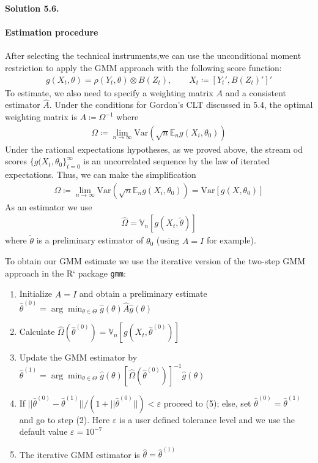 \documentclass[11pt]{article}
\newenvironment{solution}[1]
    {\bigskip\noindent\textbf{Solution #1.} \par}
    {\medskip}
\newcommand{\ev}{\mathbb{E}}
\begin{document}
\begin{solution}{5.6}
\paragraph{Estimation procedure}
After selecting the technical instruments,we can use the unconditional moment restriction  to apply the GMM approach with the following score function:
\begin{align*}
    g(X_t,\theta) = \rho(Y_t,\theta) \otimes B(Z_t), \qquad X_t \coloneq [Y_t', B(Z_t)']'
\end{align*}
To estimate, we also need to specify a weighting matrix $A$ and a consistent estimator $\hat{A}.$ Under the conditions for Gordon's CLT discussed in 5.4, the optimal weighting matrix is $A \coloneq \Omega^{-1}$ where
\begin{align*}
    \Omega \coloneq \lim_{n\to\infty} \text{Var}(\sqrt{n}\ev_ng(X_i,\theta_0))
\end{align*}
Under the rational expectations hypotheses, as we proved above, the stream od scores $\{g(X_t,\theta_0 \}_{t=0}^\infty$ is an uncorrelated sequence by the law of iterated expectations. Thus, we can make the simplification
\begin{align*}
    \Omega \coloneq \lim_{n\to\infty} \text{Var}(\sqrt{n}\ev_ng(X_i,\theta_0)) = \text{Var}\left[g(X,\theta_0)\right]
\end{align*}
As an estimator we use
\begin{align*}
    \hat{\Omega} =  \mathbb{V}_n[g(X_t,\tilde{\theta})]
\end{align*}
where $\tilde\theta$ is a preliminary estimator of $\theta_0$ (using $A = I$ for example).

\medskip

To obtain our GMM estimate we use the iterative version of the two-step GMM approach in the R` package \verb|gmm|:
\begin{enumerate}
    \item Initialize $\hat{A} = I$ and obtain a preliminary estimate $\hat{\theta}^{(0)} = \arg\min_{\theta\in\Theta} \hat{g}(\theta)\hat{A}\hat{g}(\theta)$
    \item Calculate $\hat{\Omega}(\hat{\theta}^{(0)}) = \mathbb{V}_n[g(X_t,\hat{\theta}^{(0)})]$
    \item Update the GMM estimator by $\hat{\theta}^{(1)} = \arg\min_{\theta\in\Theta} \hat{g}(\theta)\left[ \hat{\Omega}(\hat{\theta}^{(0)})\right]^{-1}\hat{g}(\theta)$ 
    \item If $||\hat{\theta}^{(0)} - \hat{\theta}^{(1)}||/(1+||\hat{\theta}^{(0)}||) < \varepsilon$ proceed to (5); else, set $\hat{\theta}^{(0)} = \hat{\theta}^{(1)}$ and go to step (2). Here $\varepsilon$ is a user defined tolerance level and we use the default value $\varepsilon  = 10^{-7}$
    \item The iterative GMM estimator is $\hat{\theta} = \hat{\theta}^{(1)}$
\end{enumerate}


\end{solution}
\end{document}
